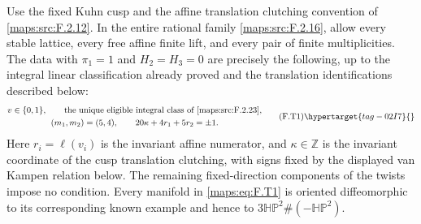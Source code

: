 \begin{theorem}\hypertarget{tag-02NE}{}\label{maps:src:F.2.24}


Use the fixed Kuhn cusp and the affine translation clutching
convention of \ref{maps:src:F.2.12}.  In the entire rational family \ref{maps:src:F.2.16},
allow every stable lattice, every free affine finite lift,
and every pair of finite multiplicities.
The data with $\pi_1=1$ and $H_2=H_3=0$ are precisely the
following, up to the integral linear classification already
proved and the translation identifications described below:
\[
\begin{gathered}
 v\in\{0,1\},\qquad
 \text{the unique eligible integral class of \ref{maps:src:F.2.23}},\\
 (m_1,m_2)=(5,4),\qquad
 20\kappa+4r_1+5r_2=\pm1.
\end{gathered}
 \tag{F.T1}\hypertarget{tag-02I7}{}\label{maps:eq:F.T1}
\]
Here $r_i=\ell(v_i)$ is the invariant affine numerator, and
$\kappa\in\mathbb Z$ is the invariant coordinate of the
cusp translation clutching, with signs fixed by the displayed
van Kampen relation below.  The remaining fixed-direction
components of the twists impose no condition.
Every manifold in \eqref{maps:eq:F.T1} is oriented diffeomorphic to its corresponding known example and hence to
$3\mathbb{HP}^2\#(-\mathbb{HP}^2)$.

\end{theorem}


